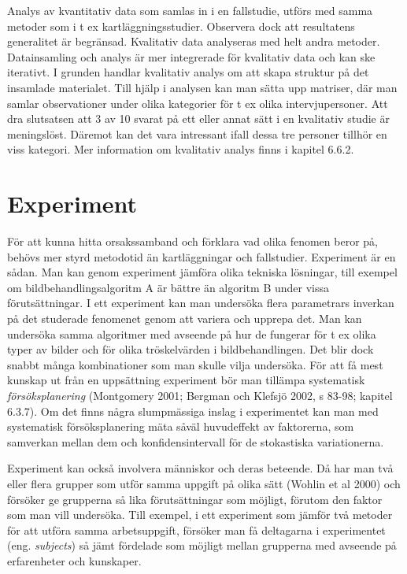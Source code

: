 Analys av kvantitativ data som samlas in i en fallstudie, utförs med
samma metoder som i t ex kartläggningsstudier. Observera dock att
resultatens generalitet är begränsad. Kvalitativ data analyseras med
helt andra metoder. Datainsamling och analys är mer integrerade för
kvalitativ data och kan ske iterativt. I grunden handlar kvalitativ
analys om att skapa struktur på det insamlade materialet. Till hjälp i
analysen kan man sätta upp matriser, där man samlar observationer under
olika kategorier för t ex olika intervjupersoner. Att dra slutsatsen att
3 av 10 svarat på ett eller annat sätt i en kvalitativ studie är
meningslöst. Däremot kan det vara intressant ifall dessa tre personer
tillhör en viss kategori. Mer information om kvalitativ analys finns i
kapitel 6.6.2.

\section{Experiment }\label{experiment}

För att kunna hitta orsakssamband och förklara vad olika fenomen beror
på, behövs mer styrd metodotid än kartläggningar och fallstudier.
Experiment är en sådan. Man kan genom experiment jämföra olika tekniska
lösningar, till exempel om bildbehandlingsalgoritm A är bättre än
algoritm B under vissa förutsättningar. I ett experiment kan man
undersöka flera parametrars inverkan på det studerade fenomenet genom
att variera och upprepa det. Man kan undersöka samma algoritmer med
avseende på hur de fungerar för t ex olika typer av bilder och för olika
tröskelvärden i bildbehandlingen. Det blir dock snabbt många
kombinationer som man skulle vilja undersöka. För att få mest kunskap ut
från en uppsättning experiment bör man tillämpa systematisk
\emph{försöksplanering} (Montgomery 2001; Bergman och Klefsjö 2002, s
83-98; kapitel 6.3.7). Om det finns några slumpmässiga inslag i
experimentet kan man med systematisk försöksplanering mäta såväl
huvudeffekt av faktorerna, som samverkan mellan dem och
konfidensintervall för de stokastiska variationerna.

Experiment kan också involvera människor och deras beteende. Då har man
två eller flera grupper som utför samma uppgift på olika sätt (Wohlin et
al 2000) och försöker ge grupperna så lika förutsättningar som möjligt,
förutom den faktor som man vill undersöka. Till exempel, i ett
experiment som jämför två metoder för att utföra samma arbetsuppgift,
försöker man få deltagarna i experimentet (eng. \emph{subjects}) så jämt
fördelade som möjligt mellan grupperna med avseende på erfarenheter och
kunskaper.

